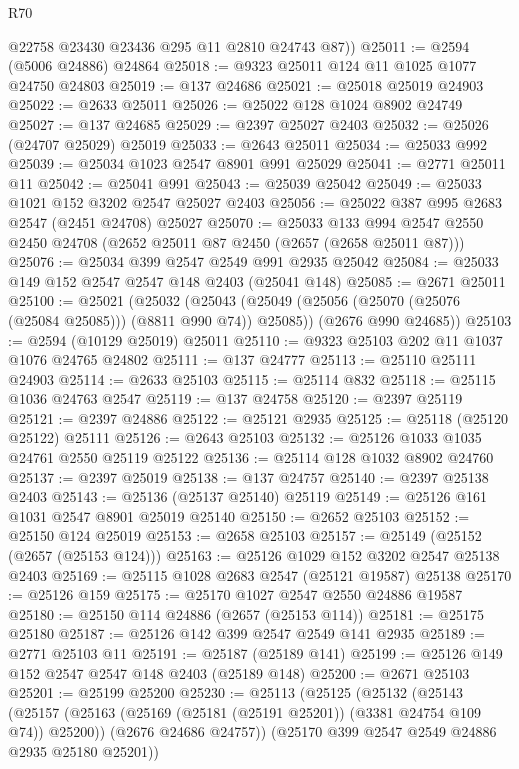 \begin{lexlean}{R70}
\begin{coremodule}
        @22758
        @23430
        @23436
        @295
        @11
        @2810
        @24743
        @87))
@25011 := @2594 (@5006 @24886) @24864
@25018 := @9323 @25011 @124 @11 @1025 @1077 @24750 @24803
@25019 := @137 @24686
@25021 := @25018 @25019 @24903
@25022 := @2633 @25011
@25026 := @25022 @128 @1024 @8902 @24749
@25027 := @137 @24685
@25029 := @2397 @25027 @2403
@25032 := @25026 (@24707 @25029) @25019
@25033 := @2643 @25011
@25034 := @25033 @992
@25039 := @25034 @1023 @2547 @8901 @991 @25029
@25041 := @2771 @25011 @11
@25042 := @25041 @991
@25043 := @25039 @25042
@25049 := @25033 @1021 @152 @3202 @2547 @25027 @2403
@25056 := @25022 @387 @995 @2683 @2547 (@2451 @24708) @25027
@25070 := @25033
    @133
    @994
    @2547
    @2550
    @2450
    @24708
    (@2652 @25011 @87 @2450 (@2657 (@2658 @25011 @87)))
@25076 := @25034 @399 @2547 @2549 @991 @2935 @25042
@25084 := @25033 @149 @152 @2547 @2547 @148 @2403 (@25041 @148)
@25085 := @2671 @25011
@25100 := @25021
    (@25032
      (@25043 (@25049 (@25056 (@25070 (@25076 (@25084 @25085))) (@8811 @990 @74)) @25085))
      (@2676 @990 @24685))
@25103 := @2594 (@10129 @25019) @25011
@25110 := @9323 @25103 @202 @11 @1037 @1076 @24765 @24802
@25111 := @137 @24777
@25113 := @25110 @25111 @24903
@25114 := @2633 @25103
@25115 := @25114 @832
@25118 := @25115 @1036 @24763 @2547
@25119 := @137 @24758
@25120 := @2397 @25119
@25121 := @2397 @24886
@25122 := @25121 @2935
@25125 := @25118 (@25120 @25122) @25111
@25126 := @2643 @25103
@25132 := @25126 @1033 @1035 @24761 @2550 @25119 @25122
@25136 := @25114 @128 @1032 @8902 @24760
@25137 := @2397 @25019
@25138 := @137 @24757
@25140 := @2397 @25138 @2403
@25143 := @25136 (@25137 @25140) @25119
@25149 := @25126 @161 @1031 @2547 @8901 @25019 @25140
@25150 := @2652 @25103
@25152 := @25150 @124 @25019
@25153 := @2658 @25103
@25157 := @25149 (@25152 (@2657 (@25153 @124)))
@25163 := @25126 @1029 @152 @3202 @2547 @25138 @2403
@25169 := @25115 @1028 @2683 @2547 (@25121 @19587) @25138
@25170 := @25126 @159
@25175 := @25170 @1027 @2547 @2550 @24886 @19587
@25180 := @25150 @114 @24886 (@2657 (@25153 @114))
@25181 := @25175 @25180
@25187 := @25126 @142 @399 @2547 @2549 @141 @2935
@25189 := @2771 @25103 @11
@25191 := @25187 (@25189 @141)
@25199 := @25126 @149 @152 @2547 @2547 @148 @2403 (@25189 @148)
@25200 := @2671 @25103
@25201 := @25199 @25200
@25230 := @25113
    (@25125
      (@25132
        (@25143
          (@25157 (@25163 (@25169 (@25181 (@25191 @25201)) (@3381 @24754 @109 @74)) @25200))
          (@2676 @24686 @24757))
        (@25170 @399 @2547 @2549 @24886 @2935 @25180 @25201))

\end{coremodule}
\end{lexlean}
